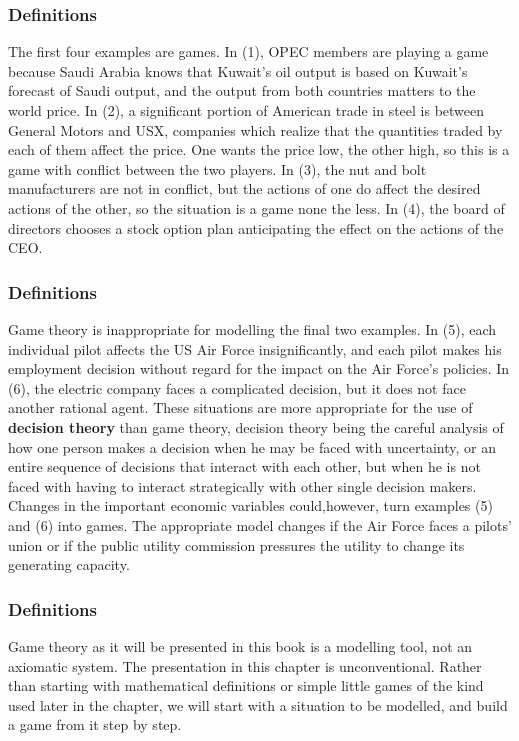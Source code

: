  \begin{frame}[fragile]\frametitle{Definitions}
The first four examples are games.  In (1), OPEC members are playing a
game because Saudi Arabia knows that Kuwait's oil output is based on Kuwait's
forecast of Saudi output, and the output from both countries matters to the
world price. In  (2), a significant portion of American trade in steel is
between General Motors and USX, companies which realize that the quantities
traded by each of them affect the price. One wants the price low, the other
high, so this is a game with conflict between the two players.  In  (3), the nut
and bolt manufacturers are not in conflict, but the actions of one  do affect
the desired actions of the other, so the situation is a game none the less. In
(4),  the board of directors chooses a stock option plan anticipating the effect
on the actions of the CEO.
\end{frame}

 \begin{frame}[fragile]\frametitle{Definitions}
 Game theory is inappropriate for modelling the final two examples. In (5),
each individual  pilot affects the US Air Force insignificantly, and each pilot
makes his employment decision without regard for the impact on the Air Force's
policies.     In (6), the electric company faces a complicated decision, but it
does not face another rational agent. These situations are more appropriate for
the use of {\bf decision theory} than game theory, decision theory being the
careful analysis of how one person makes a decision when he may be faced with
uncertainty, or an entire sequence of decisions that interact with each other,
but when he is not faced with having to interact strategically with other single
decision makers. Changes in the important economic variables could,however,
turn examples (5) and (6) into games. The appropriate model changes if  the Air
Force faces a pilots' union or if the public utility commission pressures the
utility to change its generating capacity.

\end{frame}


 \begin{frame}[fragile]\frametitle{Definitions}
  Game theory as it will be presented in this book is a modelling tool, not an
axiomatic system.  The presentation in this chapter is unconventional. Rather
than starting with mathematical definitions or simple little games of the kind
used later in the chapter, we will start with a situation to be modelled, and
build a game from it step by step.

\end{frame}

